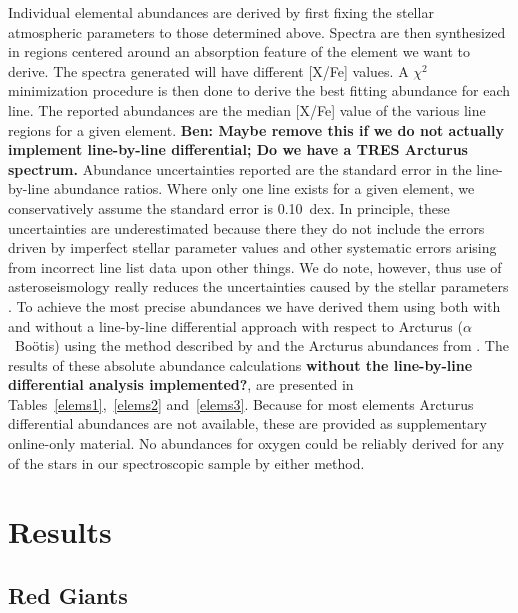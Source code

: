 \documentclass[a4paper,fleqn,usenatbib]{mnras}
\begin{document}
Individual elemental abundances are derived by first fixing the stellar atmospheric parameters to those determined above. Spectra are then synthesized  in regions centered around an absorption  feature of the element we want to derive. The spectra generated will have different [X/Fe] values. A $\chi^2$ minimization procedure is then done to derive the best fitting abundance for each line. The reported abundances are the median [X/Fe] value of the various line regions for a given element. { \bf Ben: Maybe remove this if we do not actually implement line-by-line differential; Do we have a TRES Arcturus spectrum.} Abundance uncertainties reported are the standard error in the line-by-line abundance ratios. Where only one line exists for a given element, we conservatively assume the standard error is 0.10~dex. In principle, these uncertainties are underestimated because there they do not include the errors driven by imperfect stellar parameter values and other systematic errors arising from incorrect line list data upon other things. We do note, however, thus use of asteroseismology really reduces the uncertainties caused by the stellar parameters \citep[see][for a longer discussion on this]{hawkinsapogee}. To achieve the most precise abundances we have derived them using  both with and without a line-by-line differential approach with respect to Arcturus ($\alpha$~Bo\"{o}tis) using the method described by \citet{gaiabenchmark4} and the Arcturus abundances from \citep{hawkinsapogee}. The results of these absolute abundance calculations {\bf without the line-by-line differential analysis implemented?}, are presented in Tables~\ref{elems1},~\ref{elems2} and~\ref{elems3}. Because for most elements Arcturus differential abundances are not available, these are provided as supplementary online-only material. No abundances for oxygen could be reliably derived for any of the stars in our spectroscopic sample by either method.







\section{Results}
\label{targets}

\subsection{Red Giants}
\label{rgs}
\end{document}
